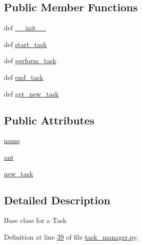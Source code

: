 \subsection*{Public Member Functions}
\begin{DoxyCompactItemize}
\item 
def \hyperlink{classtask__manager_1_1Task_aab0d2d2ec0b4b3e87969d843a101e118}{\+\_\+\+\_\+init\+\_\+\+\_\+}
\item 
def \hyperlink{classtask__manager_1_1Task_aacfcc36829c22c789f31edaf60ef1cc4}{start\+\_\+task}
\item 
def \hyperlink{classtask__manager_1_1Task_a20da98293fb7cae0c80cc0caa864c025}{perform\+\_\+task}
\item 
def \hyperlink{classtask__manager_1_1Task_a9422ddc4ca06f29aed2bbd53bfde8da4}{end\+\_\+task}
\item 
def \hyperlink{classtask__manager_1_1Task_ab46cf79945b53ec633f6f52b37c7a5cb}{get\+\_\+new\+\_\+task}
\end{DoxyCompactItemize}
\subsection*{Public Attributes}
\begin{DoxyCompactItemize}
\item 
\hyperlink{classtask__manager_1_1Task_a1a12769253144bf3a864cdff907b9fb6}{name}
\item 
\hyperlink{classtask__manager_1_1Task_ac43e25887825a1bb6e3d4a5a049968be}{ant}
\item 
\hyperlink{classtask__manager_1_1Task_af16658f4c3c447e24f73ed3d1803e058}{new\+\_\+task}
\end{DoxyCompactItemize}


\subsection{Detailed Description}
\begin{DoxyVerb}Base class for a Task
\end{DoxyVerb}
 

Definition at line \hyperlink{task__manager_8py_source_l00039}{39} of file \hyperlink{task__manager_8py_source}{task\+\_\+manager.\+py}.



